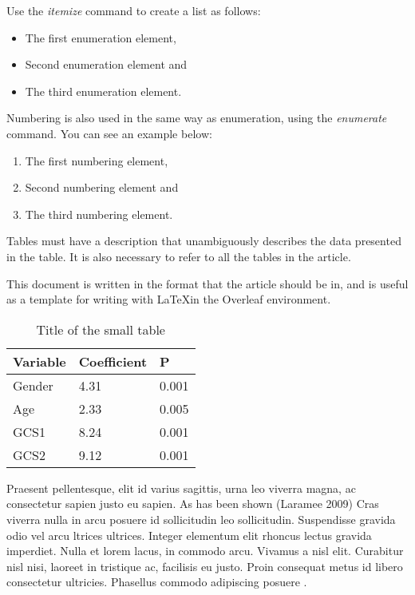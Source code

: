 \documentclass{comjnl}
\begin{document}

Use the \textit{itemize} command to create a list as follows:

\begin{itemize}
     \item The first enumeration element,
     \item Second enumeration element and
     \item The third enumeration element.
\end{itemize}

Numbering is also used in the same way as enumeration, using the \textit{enumerate} command. You can see an example below:

\begin{enumerate}
     \item The first numbering element,
     \item Second numbering element and
     \item The third numbering element.
\end{enumerate}

Tables must have a description that unambiguously describes the data presented in the table. It is also necessary to refer to all the tables in the article.

This document is written in the format that the article should be in, and is useful as a template for writing with \LaTeX in the Overleaf environment.

\begin{table}[t]
\caption{Title of the small table}
\label{tab:malatabela}
\begin{tabular}{|l|l|l|}
\hline
\rowcolor[HTML]{656565} 
{\color[HTML]{FFFFFF} Variable} & {\color[HTML]{FFFFFF} Coefficient} & {\color[HTML]{FFFFFF} P} \\ \hline
Gender & 4.31 & 0.001 \\ \hline
Age & 2.33 & 0.005 \\ \hline
GCS1 & 8.24 & 0.001 \\ \hline
GCS2 & 9.12 & 0.001 \\ \hline
\end{tabular}
\end{table}

Praesent pellentesque, elit id varius sagittis, urna leo viverra magna, ac consectetur sapien justo eu sapien. As has been shown (Laramee 2009) Cras viverra nulla in arcu posuere id sollicitudin leo sollicitudin. Suspendisse gravida odio vel arcu ltrices ultrices. Integer elementum elit rhoncus lectus gravida imperdiet. Nulla et lorem lacus, in commodo arcu. Vivamus a nisl elit. Curabitur nisl nisi, laoreet in tristique ac, facilisis eu justo. Proin consequat metus id libero consectetur ultricies. Phasellus commodo adipiscing posuere \cite{Figl2013}.
\end{document}
